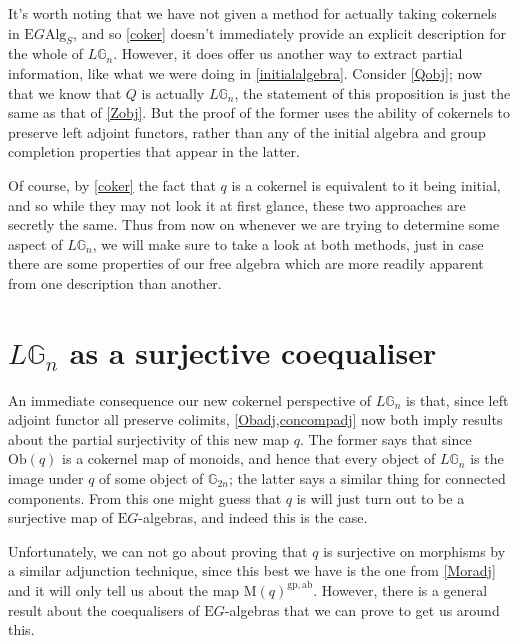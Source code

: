 It's worth noting that we have not given a method for actually taking cokernels in $\mathrm{E}G\mathrm{Alg}_S$, and so \cref{coker} doesn't immediately provide an explicit description for the whole of $L\mathbb{G}_n$. However, it does offer us another way to extract partial information, like what we were doing in \cref{initialalgebra}. Consider \cref{Qobj}; now that we know that $Q$ is actually $L\mathbb{G}_n$, the statement of this proposition is just the same as that of \cref{Zobj}. But the proof of the former uses the ability of cokernels to preserve left adjoint functors, rather than any of the initial algebra and group completion properties that appear in the latter.

Of course, by \cref{coker} the fact that $q$ is a cokernel is equivalent to it being initial, and so while they may not look it at first glance, these two approaches are secretly the same. Thus from now on whenever we are trying to determine some aspect of $L\mathbb{G}_n$, we will make sure to take a look at both methods, just in case there are some properties of our free algebra which are more readily apparent from one description than another.

\section{$L\mathbb{G}_n$ as a surjective coequaliser} \label{surjcoeq}

An immediate consequence our new cokernel perspective of $L\mathbb{G}_n$ is that, since left adjoint functor all preserve colimits, \cref{Obadj,concompadj} now both imply results about the partial surjectivity of this new map $q$. The former says that since $\mathrm{Ob}(q)$ is a cokernel map of monoids, and hence that every object of $L\mathbb{G}_n$ is the image under $q$ of some object of $\mathbb{G}_{2n}$; the latter says a similar thing for connected components. From this one might guess that $q$ is will just turn out to be a surjective map of $\mathrm{E}G$-algebras, and indeed this is the case.

Unfortunately, we can not go about proving that $q$ is surjective on morphisms by a similar adjunction technique, since this best we have is the one from \cref{Moradj} and it will only tell us about the map $\mathrm{M}(q)^{\mathrm{gp},\mathrm{ab}}$. However, there is a general result about the coequalisers of $\mathrm{E}G$-algebras that we can prove to get us around this.

